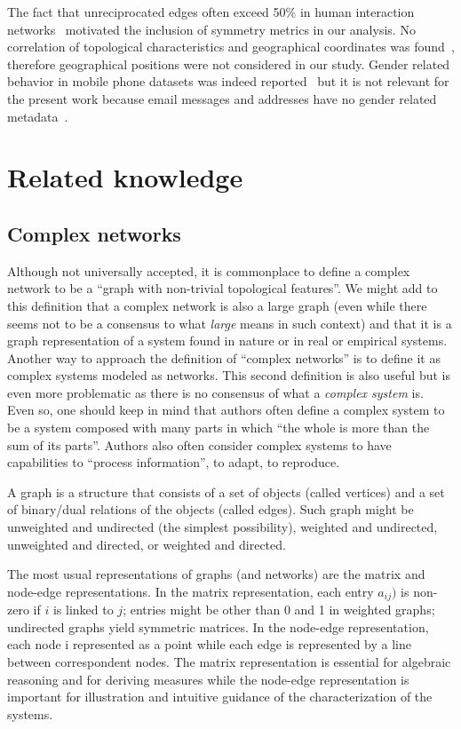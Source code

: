 The fact that unreciprocated edges often exceed 50\% in human interaction networks~\cite{newmanEvolving} motivated the inclusion of symmetry metrics in our analysis.
No correlation of topological characteristics and geographical coordinates was found~\cite{barabasiGeo},
therefore geographical positions were not considered in our study.
Gender related behavior in mobile phone datasets was indeed reported~\cite{barabasiSex}
but it is not relevant for the present work because email messages and addresses have no gender related metadata~\cite{gmanePack}.

\section{Related knowledge}
\subsection{Complex networks}
Although not universally accepted, it is commonplace to define a complex network to be
a ``graph with non-trivial topological features''.
We might add to this definition that a complex network is also a large graph (even while there
seems not to be a consensus to what \emph{large} means in such context)
and that it is a graph representation of a system found in nature or in real or empirical systems.
Another way to approach the definition of ``complex networks'' is to define it as
complex systems modeled as networks.
This second definition is also useful but is even more problematic as
there is no consensus of what a \emph{complex system} is.
Even so, one should keep in mind that authors often define a complex system
to be a system composed with many parts in which ``the whole is more than
the sum of its parts''.
Authors also often consider complex systems to have capabilities
to ``process information'', to adapt, to reproduce. 

A graph is a structure that consists of a set of objects (called vertices)
and a set of binary/dual relations of the objects (called edges).
Such graph might be unweighted and undirected (the simplest possibility),
weighted and undirected, unweighted and directed, or weighted and directed.

The most usual representations of graphs (and networks) are the matrix and node-edge representations.
In the matrix representation, each entry $a_{ij})$ is non-zero if $i$ is linked to $j$;
entries might be other than 0 and 1 in weighted graphs; undirected graphs yield symmetric matrices.
In the node-edge representation, each node i represented as a point while each edge is represented
by a line between correspondent nodes.
The matrix representation is essential for algebraic reasoning and for deriving measures
while the node-edge representation is important for illustration and intuitive guidance
of the characterization of the systems.

